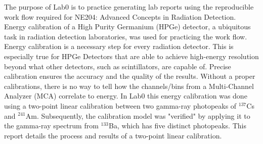 The purpose of Lab0 is to practice generating lab reports using the reproducible work flow required for NE204: Advanced Concepts in Radiation Detection. Energy calibration of a High Purity Germanium (HPGe) detector, a ubiquitous task in radiation detection laboratories, was used for practicing the work flow. Energy calibration is a necessary step for every radiation detector. This is especially true for HPGe Detectors that are able to achieve high-energy resolution beyond what other detectors, such as scintillators, are capable of. Precise calibration ensures the accuracy and the quality of the results. Without a proper calibrations, there is no way to tell how the channels/bins from a Multi-Channel Analyzer (MCA) correlate to energy. In Lab0 this energy calibration was done using a two-point linear calibration between two gamma-ray photopeaks of $^{137}$Cs and $^{241}$Am. Subsequently, the calibration model was "verified" by applying it to the gamma-ray spectrum from $^{133}$Ba, which has five distinct photopeaks. This report details the process and results of a two-point linear calibration.
